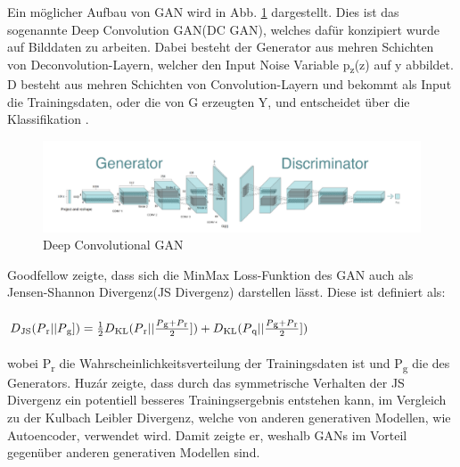 \documentclass{llncs}
\begin{document}
\\\\
Ein möglicher Aufbau von GAN wird in Abb. \ref{fig:Bild21} dargestellt. Dies ist das sogenannte Deep Convolution GAN(DC GAN), welches dafür konzipiert wurde auf Bilddaten zu arbeiten. Dabei besteht der Generator aus mehren Schichten von Deconvolution-Layern, welcher den Input Noise Variable p\textsubscript{z}(z) auf y abbildet. D besteht aus mehren Schichten von Convolution-Layern und bekommt als Input die Trainingsdaten, oder die von G erzeugten Y, und entscheidet über die Klassifikation \cite{dcgan}.
\begin{figure}[htbp] 
	\centering
	\includegraphics[width=1.0\textwidth]{dcgan1.png}
	\caption{Deep Convolutional GAN\protect\cite{dc-gan_book}}
	\label{fig:Bild21}
\end{figure}
Goodfellow \cite{goodfellow2014} zeigte, dass sich die MinMax Loss-Funktion des GAN auch als Jensen-Shannon Divergenz(JS Divergenz) darstellen lässt. Diese ist definiert als:
\\\\
\begin{math} D\textsubscript{JS}(P\textsubscript{r}|| P\textsubscript{g}])=\frac{1}{2}D\textsubscript{KL}(P\textsubscript{r}|| \frac{P\textsubscript{g}+P\textsubscript{r}}{2}])+D\textsubscript{KL}(P\textsubscript{q}|| \frac{P\textsubscript{g}+P\textsubscript{r}}{2}])  
\end{math}
\\\\
wobei P\textsubscript{r} die Wahrscheinlichkeitsverteilung der Trainingsdaten ist und P\textsubscript{g} die des Generators. Huzár \cite{sha} zeigte, dass durch das symmetrische Verhalten der JS Divergenz ein potentiell besseres Trainingsergebnis entstehen kann, im Vergleich zu der Kulbach Leibler Divergenz, welche von anderen generativen Modellen, wie Autoencoder, verwendet wird. Damit zeigte er, weshalb GANs im Vorteil gegenüber anderen generativen Modellen sind.
\newpage
\end{document}
